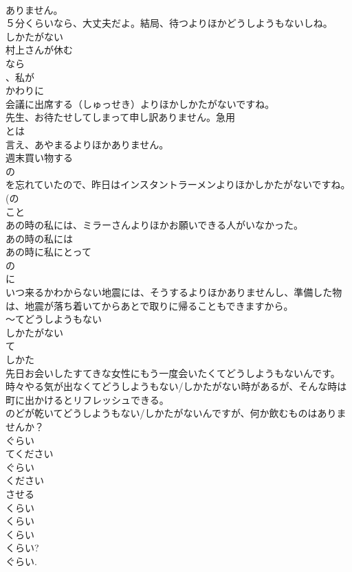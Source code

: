 \documentclass[8pt]{extreport}
\begin{document}
\begin{CJK}{UTF8}{min}
\\	ありません。
\\	５分くらいなら、大丈夫だよ。結局、待つよりほかどうしようもないしね。 
\\	しかたがない 
\\	村上さんが休む
\\	なら
\\	、私が
\\	かわりに
\\	会議に出席する（しゅっせき）よりほかしかたがないですね。
\\	先生、お待たせしてしまって申し訳ありません。急用
\\	とは
\\	言え、あやまるよりほかありません。　
\\	週末買い物する
\\	の
\\	を忘れていたので、昨日はインスタントラーメンよりほかしかたがないですね。 (の 
\\	こと 
\\	あの時の私には、ミラーさんよりほかお願いできる人がいなかった。
\\	あの時の私には
\\	あの時に私にとって　
\\	の
\\	に
\\	いつ来るかわからない地震には、そうするよりほかありませんし、準備した物は、地震が落ち着いてからあとで取りに帰ることもできますから。　
\\	～てどうしようもない
\\	しかたがない
\\	て 
\\	しかた
\\	先日お会いしたすてきな女性にもう一度会いたくてどうしようもないんです。
\\	時々やる気が出なくてどうしようもない/しかたがない時があるが、そんな時は町に出かけるとリフレッシュできる。
\\	のどが乾いてどうしようもない/しかたがないんですが、何か飲むものはありませんか？
\\	ぐらい
\\	てください
\\	ぐらい
\\	ください
\\	させる 
\\	くらい
\\	くらい
\\	くらい
\\	くらい? 
\\	ぐらい.

\end{CJK}
\end{document}
